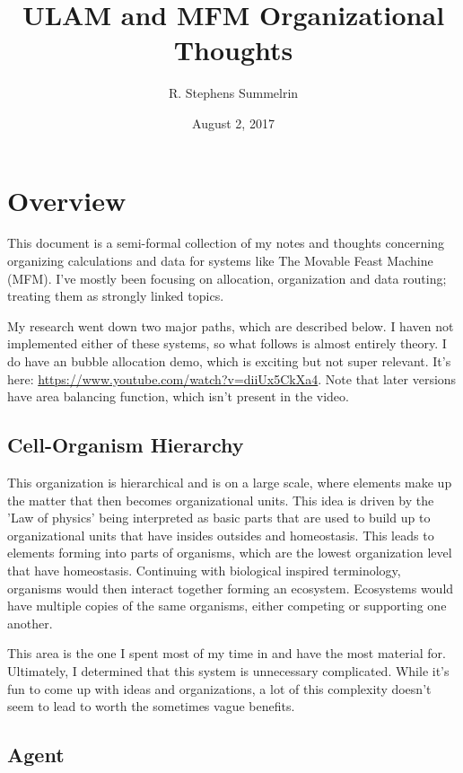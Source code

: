 \documentclass[article,12pt,oneside]{memoir}
\title{ULAM and MFM Organizational Thoughts}
\date{August 2, 2017}
\author{R. Stephens Summelrin}
\begin{document}
\maketitle
\tableofcontents

\pagebreak
\chapter{Overview}

This document is a semi-formal collection of my notes and thoughts concerning organizing calculations and data for systems like The Movable Feast Machine (MFM).
I've mostly been focusing on allocation, organization and data routing; treating them as strongly linked topics.

My research went down two major paths, which are described below.
I haven not implemented either of these systems, so what follows is almost entirely theory.
I do have an bubble allocation demo, which is exciting but not super relevant.
It's here: \url{https://www.youtube.com/watch?v=diiUx5CkXa4}.
Note that later versions have area balancing function, which isn't present in the video.


\section{Cell-Organism Hierarchy}

This organization is hierarchical and is on a large scale, where elements make up the matter that then becomes organizational units.
This idea is driven by the 'Law of physics' being interpreted as basic parts that are used to build up to organizational units that have insides outsides and homeostasis.
This leads to elements forming into parts of organisms, which are the lowest organization level that have homeostasis.
Continuing with biological inspired terminology, organisms would then interact together forming an ecosystem.
Ecosystems would have multiple copies of the same organisms, either competing or supporting one another.

This area is the one I spent most of my time in and have the most material for.
Ultimately, I determined that this system is unnecessary complicated.
While it's fun to come up with ideas and organizations, a lot of this complexity doesn't seem to lead to worth the sometimes vague benefits.


\section{Agent}
\end{document}
